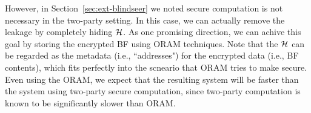 However, in Section~\ref{sec:ext-blindseer} we noted secure computation is not
necessary in the two-party setting. In this case, we can actually remove the
leakage by completely hiding ${\cal H}$. As one promising direction, we can achive
this goal by storing the encrypted BF using ORAM techniques. Note that the
${\cal H}$ can be regarded as the metadata (i.e., ``addresses") for the encrypted
data (i.e., BF contents), which fits perfectly into the scneario that ORAM
tries to make secure. 
%
Even using the ORAM, we expect that the resulting system will be faster than
the system using two-party secure computation, since two-party computation is
known to be significantly slower than ORAM. 

